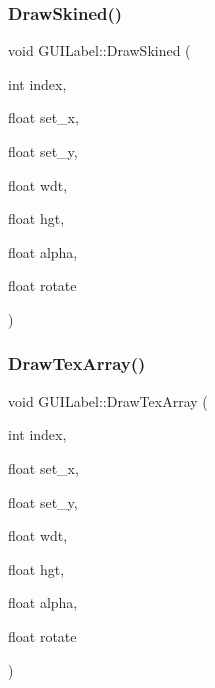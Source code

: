 \hypertarget{class_g_u_i_label_a5c60113de47ea19a45e8d1efd48c6400}{}\label{class_g_u_i_label_a5c60113de47ea19a45e8d1efd48c6400} 
\subsubsection{\texorpdfstring{Draw\+Skined()}{DrawSkined()}}
{\footnotesize\ttfamily void G\+U\+I\+Label\+::\+Draw\+Skined (\begin{DoxyParamCaption}\item[{int}]{index,  }\item[{float}]{set\+\_\+x,  }\item[{float}]{set\+\_\+y,  }\item[{float}]{wdt,  }\item[{float}]{hgt,  }\item[{float}]{alpha,  }\item[{float}]{rotate }\end{DoxyParamCaption})}

\hypertarget{class_g_u_i_label_a35f140c926c433eefbdadb3fa6a10336}{}\label{class_g_u_i_label_a35f140c926c433eefbdadb3fa6a10336} 
\subsubsection{\texorpdfstring{Draw\+Tex\+Array()}{DrawTexArray()}\hspace{0.1cm}{\footnotesize\ttfamily [1/2]}}
{\footnotesize\ttfamily void G\+U\+I\+Label\+::\+Draw\+Tex\+Array (\begin{DoxyParamCaption}\item[{int}]{index,  }\item[{float}]{set\+\_\+x,  }\item[{float}]{set\+\_\+y,  }\item[{float}]{wdt,  }\item[{float}]{hgt,  }\item[{float}]{alpha,  }\item[{float}]{rotate }\end{DoxyParamCaption})}

\hypertarget{class_g_u_i_label_ac8f8a84d61cd688de9b7b2eb4be97bab}{}\label{class_g_u_i_label_ac8f8a84d61cd688de9b7b2eb4be97bab} 

